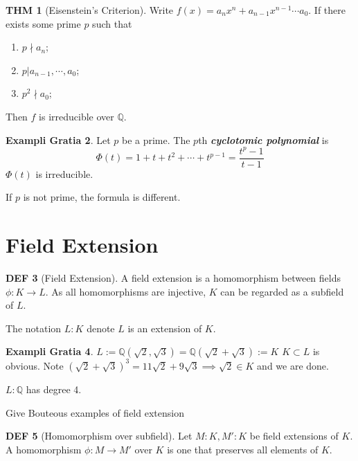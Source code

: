 \documentclass[twocolumn]{article}
\renewcommand{\emph}[1]{\textbf{\textit{#1}}}
\newcommand{\Q}{\mathbb{Q}}
\theoremstyle{definition}
\newtheorem{thm}{THM}
\newtheorem{example}[thm]{Exampli Gratia}
\newtheorem{defi}[thm]{DEF}
\theoremstyle{remark}
\begin{document}
\begin{thm}[Eisenstein's Criterion]
	Write $f(x) = a_n x^n + a_{n-1}x^{n-1} \cdots a_0$.
	If there exists some prime $p$ such that 
	\begin{enumerate}
		\item $p \nmid a_n$;
		\item $p | a_{n-1}, \cdots, a_0$;
		\item $p^2 \nmid  a_0$;
	\end{enumerate}
	Then $f$ is irreducible over $\Q$.
\end{thm}

\begin{example}
	Let $p$ be a prime. 
	The $p$th \emph{cyclotomic polynomial} is 
	$$
		\Phi(t) = 1 + t + t^2 + \cdots + t^{p-1} = \frac{t^p - 1}{t - 1}
	$$
	$\Phi(t)$ is irreducible.

	If $p$ is not prime, the formula is different.
\end{example}

\section{Field Extension}

\begin{defi}[Field Extension]
	A field extension is a homomorphism between fields $\phi: K \rightarrow L$. 
	As all homomorphisms are injective, $K$ can be regarded as a subfield of $L$.

	The notation $L:K$ denote $L$ is an extension of $K$.
\end{defi}

\begin{example}
	$L := \Q(\sqrt{2}, \sqrt{3}) = \Q(\sqrt{2} + \sqrt{3}) := K$
	$K \subset L$ is obvious.
	Note $(\sqrt{2} + \sqrt{3})^3 = 11 \sqrt{2} + 9 \sqrt{3} \implies \sqrt{2} \in K$ and we are done.

	$L : \Q$ has degree 4.
\end{example}

\begin{toverify}{Give Bouteous examples of field extension}{}

\end{toverify}

\begin{defi}[Homomorphism over subfield]
	Let $M : K, M' : K$ be field extensions of $K$. A homomorphism $\phi: M \rightarrow M'$ over $K$ is one that preserves all elements of $K$.
\end{defi}
\end{document}
